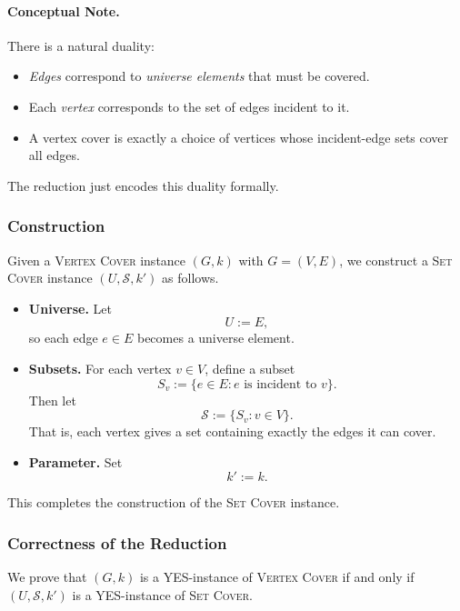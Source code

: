 \documentclass[9pt]{extarticle}
\begin{document}
\paragraph{Conceptual Note.}
There is a natural duality:
\begin{itemize}
    \item \emph{Edges} correspond to \emph{universe elements} that must be covered.
    \item Each \emph{vertex} corresponds to the set of edges incident to it.
    \item A vertex cover is exactly a choice of vertices whose incident-edge
          sets cover all edges.
\end{itemize}
The reduction just encodes this duality formally.

\subsubsection*{Construction}

Given a \textsc{Vertex Cover} instance $(G,k)$ with $G=(V,E)$, we construct a
\textsc{Set Cover} instance $(U,\mathcal{S},k')$ as follows.

\begin{itemize}
    \item \textbf{Universe.}
    Let
    \[
        U := E,
    \]
    so each edge $e \in E$ becomes a universe element.

    \item \textbf{Subsets.}
    For each vertex $v \in V$, define a subset
    \[
        S_v := \{ e \in E : e \text{ is incident to } v \}.
    \]
    Then let
    \[
        \mathcal{S} := \{ S_v : v \in V \}.
    \]
    That is, each vertex gives a set containing exactly the edges it can cover.

    \item \textbf{Parameter.}
    Set
    \[
        k' := k.
    \]
\end{itemize}

This completes the construction of the \textsc{Set Cover} instance.

\subsubsection*{Correctness of the Reduction}

We prove that $(G,k)$ is a YES-instance of \textsc{Vertex Cover} if and only if
$(U,\mathcal{S},k')$ is a YES-instance of \textsc{Set Cover}.
\end{document}
